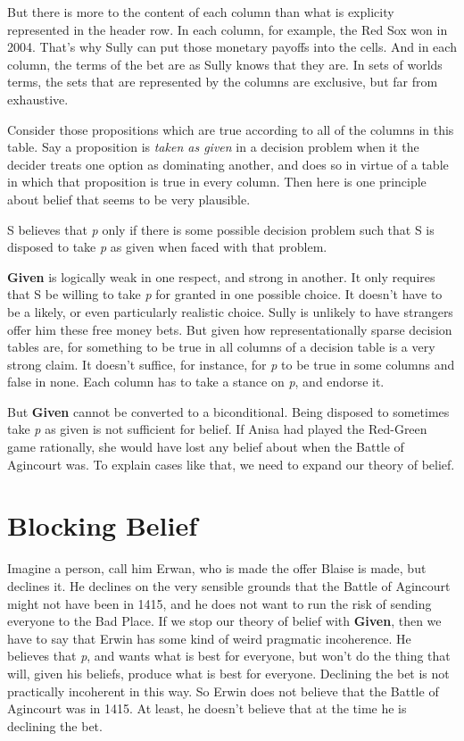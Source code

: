 \documentclass[
  11pt,
]{book}
\providecommand{\tightlist}{%
  \setlength{\itemsep}{0pt}\setlength{\parskip}{0pt}}
\begin{document}
But there is more to the content of each column than what is explicity represented in the header row. In each column, for example, the Red Sox won in 2004. That's why Sully can put those monetary payoffs into the cells. And in each column, the terms of the bet are as Sully knows that they are. In sets of worlds terms, the sets that are represented by the columns are exclusive, but far from exhaustive.

Consider those propositions which are true according to all of the columns in this table. Say a proposition is \emph{taken as given} in a decision problem when it the decider treats one option as dominating another, and does so in virtue of a table in which that proposition is true in every column. Then here is one principle about belief that seems to be very plausible.

\begin{description}
\tightlist
\item[Given]
S believes that \emph{p} only if there is some possible decision problem such that S is disposed to take \emph{p} as given when faced with that problem.
\end{description}

\textbf{Given} is logically weak in one respect, and strong in another. It only requires that S be willing to take \emph{p} for granted in one possible choice. It doesn't have to be a likely, or even particularly realistic choice. Sully is unlikely to have strangers offer him these free money bets. But given how representationally sparse decision tables are, for something to be true in all columns of a decision table is a very strong claim. It doesn't suffice, for instance, for \emph{p} to be true in some columns and false in none. Each column has to take a stance on \emph{p}, and endorse it.

But \textbf{Given} cannot be converted to a biconditional. Being disposed to sometimes take \emph{p} as given is not sufficient for belief. If Anisa had played the Red-Green game rationally, she would have lost any belief about when the Battle of Agincourt was. To explain cases like that, we need to expand our theory of belief.

\hypertarget{block}{%
\section{Blocking Belief}\label{block}}

Imagine a person, call him Erwan, who is made the offer Blaise is made, but declines it. He declines on the very sensible grounds that the Battle of Agincourt might not have been in 1415, and he does not want to run the risk of sending everyone to the Bad Place. If we stop our theory of belief with \textbf{Given}, then we have to say that Erwin has some kind of weird pragmatic incoherence. He believes that \emph{p}, and wants what is best for everyone, but won't do the thing that will, given his beliefs, produce what is best for everyone. Declining the bet is not practically incoherent in this way. So Erwin does not believe that the Battle of Agincourt was in 1415. At least, he doesn't believe that at the time he is declining the bet.
\end{document}
